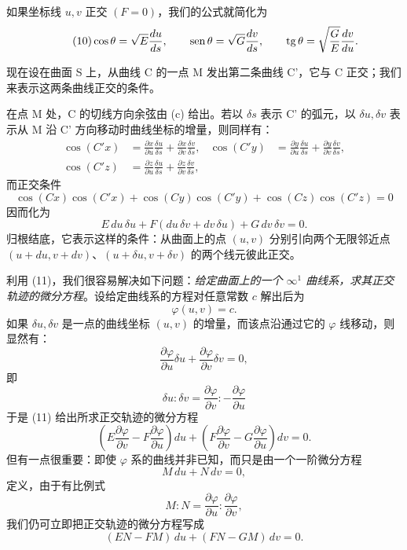 如果坐标线 \(u,v\) 正交 \((F=0)\)，我们的公式就简化为
\begin{equation}\tag{10}
 \cos\theta=\sqrt E\frac{du}{ds},\qquad
 \operatorname{sen}\theta=\sqrt G\frac{dv}{ds},\qquad
 \operatorname{tg}\theta=\sqrt{\frac{G}{E}}\frac{dv}{du}.
\end{equation}

现在设在曲面 S 上，从曲线 C 的一点 M 发出第二条曲线 C'，它与 C 正交；我们来表示这两条曲线正交的条件。

在点 M 处，C 的切线方向余弦由 (c) 给出。若以 \(\delta s\) 表示 C' 的弧元，以 \(\delta u,\delta v\) 表示从 M 沿 C' 方向移动时曲线坐标的增量，则同样有：
\[
\begin{aligned}
\cos(C'x)&=\frac{\partial x}{\partial u}\frac{\delta u}{\delta s}+\frac{\partial x}{\partial v}\frac{\delta v}{\delta s},&
\cos(C'y)&=\frac{\partial y}{\partial u}\frac{\delta u}{\delta s}+\frac{\partial y}{\partial v}\frac{\delta v}{\delta s},\\
\cos(C'z)&=\frac{\partial z}{\partial u}\frac{\delta u}{\delta s}+\frac{\partial z}{\partial v}\frac{\delta v}{\delta s},
\end{aligned}
\]
而正交条件
\[
\cos(Cx)\cos(C'x)+\cos(Cy)\cos(C'y)+\cos(Cz)\cos(C'z)=0
\]
因而化为
\begin{equation}\tag{11}
 E\,du\,\delta u+F(du\,\delta v+dv\,\delta u)+G\,dv\,\delta v=0.
\end{equation}
归根结底，它表示这样的条件：从曲面上的点 \((u,v)\) 分别引向两个无限邻近点 \((u+du,v+dv)\)、\((u+\delta u,v+\delta v)\) 的两个线元彼此正交。

利用 (11)，我们很容易解决如下问题：\emph{给定曲面上的一个 \(\infty^1\) 曲线系，求其正交轨迹的微分方程}。设给定曲线系的方程对任意常数 \(c\) 解出后为
\[
 \varphi(u,v)=c.
\]
如果 \(\delta u,\delta v\) 是一点的曲线坐标 \((u,v)\) 的增量，而该点沿通过它的 \(\varphi\) 线移动，则显然有：
\[
 \frac{\partial\varphi}{\partial u}\delta u+
 \frac{\partial\varphi}{\partial v}\delta v=0,
\]
即
\[
 \delta u:\delta v=\frac{\partial\varphi}{\partial v}:-\frac{\partial\varphi}{\partial u}
\]
于是 (11) 给出所求正交轨迹的微分方程
\begin{equation}\tag{12}
\left(E\frac{\partial\varphi}{\partial v}-F\frac{\partial\varphi}{\partial u}\right)du+
\left(F\frac{\partial\varphi}{\partial v}-G\frac{\partial\varphi}{\partial u}\right)dv=0.
\end{equation}
但有一点很重要：即使 \(\varphi\) 系的曲线并非已知，而只是由一个一阶微分方程
\[
 M\,du+N\,dv=0,
\]
定义，由于有比例式
\[
 M:N=\frac{\partial\varphi}{\partial u}:\frac{\partial\varphi}{\partial v},
\]
我们仍可立即把正交轨迹的微分方程写成
\begin{equation}\tag{13}
 (EN-FM)\,du+(FN-GM)\,dv=0.
\end{equation}

